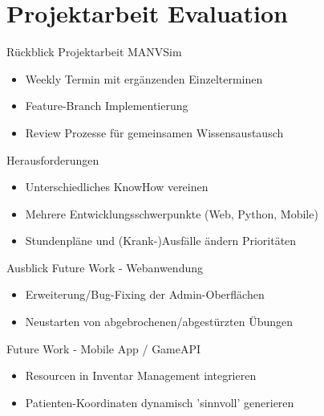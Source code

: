 \section{Projektarbeit Evaluation}

\begin{frame}{Rückblick}
	Projektarbeit MANVSim 
	\begin{itemize}
		\item Weekly Termin mit ergänzenden Einzelterminen
		\item Feature-Branch Implementierung
		\item Review Prozesse für gemeinsamen Wissensaustausch
	\end{itemize}
    Herausforderungen
	\begin{itemize}
		\item Unterschiedliches KnowHow vereinen
		\item Mehrere Entwicklungsschwerpunkte (Web, Python, Mobile)
		\item Stundenpläne und (Krank-)Ausfälle ändern Prioritäten
	\end{itemize}
\end{frame}
\begin{frame}{Ausblick}
	Future Work - Webanwendung
	\begin{itemize}
		\item Erweiterung/Bug-Fixing der Admin-Oberflächen
		\item Neustarten von abgebrochenen/abgestürzten Übungen
	\end{itemize}
    Future Work - Mobile App / GameAPI
	\begin{itemize}
		\item Resourcen in Inventar Management integrieren
		\item Patienten-Koordinaten dynamisch 'sinnvoll' generieren
	\end{itemize}
\end{frame}